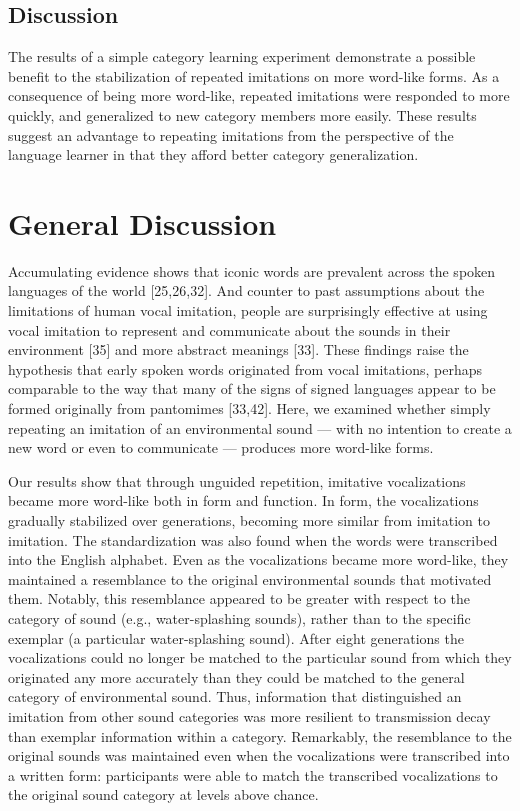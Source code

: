 \documentclass[english,floatsintext,man]{apa6}
\theoremstyle{definition}
\theoremstyle{definition}
\theoremstyle{definition}
\theoremstyle{remark}
\begin{document}
\hypertarget{discussion-2}{%
\subsection{Discussion}\label{discussion-2}}

The results of a simple category learning experiment demonstrate a
possible benefit to the stabilization of repeated imitations on more
word-like forms. As a consequence of being more word-like, repeated
imitations were responded to more quickly, and generalized to new
category members more easily. These results suggest an advantage to
repeating imitations from the perspective of the language learner in
that they afford better category generalization.

\hypertarget{general-discussion}{%
\section{General Discussion}\label{general-discussion}}

Accumulating evidence shows that iconic words are prevalent across the
spoken languages of the world {[}25,26,32{]}. And counter to past
assumptions about the limitations of human vocal imitation, people are
surprisingly effective at using vocal imitation to represent and
communicate about the sounds in their environment {[}35{]} and more
abstract meanings {[}33{]}. These findings raise the hypothesis that
early spoken words originated from vocal imitations, perhaps comparable
to the way that many of the signs of signed languages appear to be
formed originally from pantomimes {[}33,42{]}. Here, we examined whether
simply repeating an imitation of an environmental sound --- with no
intention to create a new word or even to communicate --- produces more
word-like forms.

Our results show that through unguided repetition, imitative
vocalizations became more word-like both in form and function. In form,
the vocalizations gradually stabilized over generations, becoming more
similar from imitation to imitation. The standardization was also found
when the words were transcribed into the English alphabet. Even as the
vocalizations became more word-like, they maintained a resemblance to
the original environmental sounds that motivated them. Notably, this
resemblance appeared to be greater with respect to the category of sound
(e.g., water-splashing sounds), rather than to the specific exemplar (a
particular water-splashing sound). After eight generations the
vocalizations could no longer be matched to the particular sound from
which they originated any more accurately than they could be matched to
the general category of environmental sound. Thus, information that
distinguished an imitation from other sound categories was more
resilient to transmission decay than exemplar information within a
category. Remarkably, the resemblance to the original sounds was
maintained even when the vocalizations were transcribed into a written
form: participants were able to match the transcribed vocalizations to
the original sound category at levels above chance.
\end{document}
